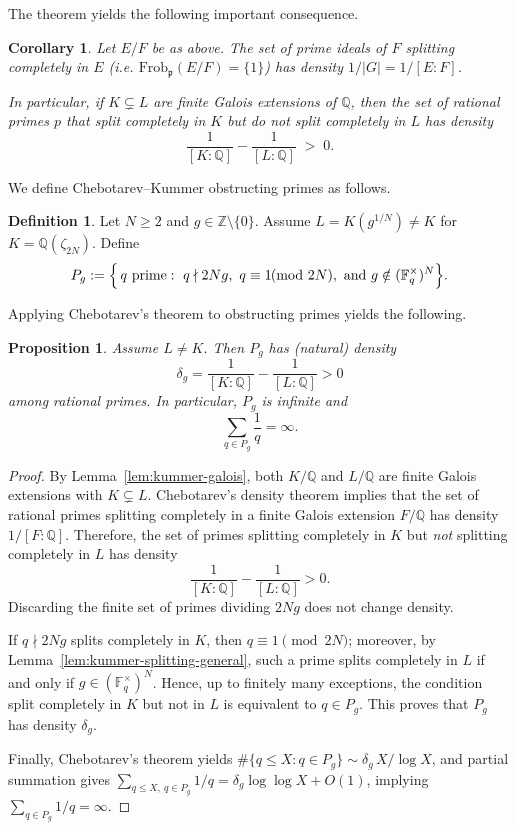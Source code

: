 \documentclass[11pt,letterpaper]{amsart}
\newcommand{\Z}{\mathbb{Z}}
\newcommand{\Q}{\mathbb{Q}}
\newcommand{\F}{\mathbb{F}}
\theoremstyle{plain}
\newtheorem{proposition}[theorem]{Proposition}
\newtheorem{corollary}[theorem]{Corollary}
\theoremstyle{definition}
\newtheorem{definition}[theorem]{Definition}
\theoremstyle{remark}
\theoremstyle{plain}
\begin{document}
The theorem yields the following important consequence.
\begin{corollary}
Let $E/F$ be as above.  The set of prime ideals of $F$ splitting completely in $E$
(i.e. $\mathrm{Frob}_{\mathfrak p}(E/F)=\{1\}$) has density $1/|G|=1/[E:F]$.

In particular, if $K\subsetneq L$ are finite Galois extensions of $\mathbb Q$, then
the set of rational primes $p$ that split completely in $K$ but do \emph{not} split
completely in $L$ has density
\[
\frac{1}{[K:\mathbb Q]}-\frac{1}{[L:\mathbb Q]}\;>\;0.
\]
\end{corollary}

We define Chebotarev--Kummer obstructing primes as follows.

\begin{definition}
\label{def:Pg-general}
Let $N\ge 2$ and $g\in\Z\setminus\{0\}$.
Assume $L=K(g^{1/N})\neq K$ for $K=\Q(\zeta_{2N})$.
Define
\[
P_g
:=\Bigl\{\,q\ \text{prime}:\ q\nmid 2Ng,\ q\equiv 1\!\!\!\pmod{2N},\ \text{and } g\notin(\F_q^\times)^N \Bigr\}.
\]
\end{definition}

Applying Chebotarev's theorem to obstructing primes yields the following.
\begin{proposition}
\label{prop:Pg-positive-density-general}
Assume $L\neq K$.
Then $P_g$ has (natural) density
\[
\delta_g=\frac{1}{[K:\Q]}-\frac{1}{[L:\Q]}>0
\]
among rational primes.  In particular, $P_g$ is infinite and
\[
\sum_{q\in P_g}\frac{1}{q}=\infty.
\]
\end{proposition}

\begin{proof}
By Lemma~\ref{lem:kummer-galois}, both $K/\Q$ and $L/\Q$ are finite Galois extensions with $K\subsetneq L$.
Chebotarev's density theorem implies that the set of rational primes splitting completely in a finite Galois
extension $F/\Q$ has density $1/[F:\Q]$.
Therefore, the set of primes splitting completely in $K$ but \emph{not} splitting completely in $L$ has density
\[
\frac{1}{[K:\Q]}-\frac{1}{[L:\Q]}>0.
\]
Discarding the finite set of primes dividing $2Ng$ does not change density.

If $q\nmid 2Ng$ splits completely in $K$, then $q\equiv 1\pmod{2N}$; moreover, by
Lemma~\ref{lem:kummer-splitting-general}, such a prime splits completely in $L$ if and only if
$g\in(\F_q^\times)^N$. Hence, up to finitely many exceptions, the condition
split completely in $K$ but not in $L$ is equivalent to $q\in P_g$.
This proves that $P_g$ has density $\delta_g$.

Finally, Chebotarev's theorem yields
$\#\{q\le X: q\in P_g\}\sim \delta_g\,X/\log X$, and partial summation gives
$\sum_{q\le X,\ q\in P_g}1/q=\delta_g\log\log X+O(1)$, implying $\sum_{q\in P_g}1/q=\infty$.
\end{proof}
\end{document}
